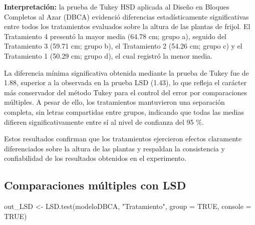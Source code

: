 \documentclass[
  spanish,
  letterpaper,
  DIV=11,
  numbers=noendperiod]{scrreprt}
\newenvironment{Shaded}{\begin{snugshade}}{\end{snugshade}}
\newcommand{\AttributeTok}[1]{\textcolor[rgb]{0.40,0.45,0.13}{#1}}
\newcommand{\ConstantTok}[1]{\textcolor[rgb]{0.56,0.35,0.01}{#1}}
\newcommand{\FunctionTok}[1]{\textcolor[rgb]{0.28,0.35,0.67}{#1}}
\newcommand{\NormalTok}[1]{\textcolor[rgb]{0.00,0.23,0.31}{#1}}
\newcommand{\OtherTok}[1]{\textcolor[rgb]{0.00,0.23,0.31}{#1}}
\newcommand{\StringTok}[1]{\textcolor[rgb]{0.13,0.47,0.30}{#1}}
\begin{document}
\textbf{Interpretación:} la prueba de Tukey HSD aplicada al Diseño en
Bloques Completos al Azar (DBCA) evidenció diferencias estadísticamente
significativas entre todos los tratamientos evaluados sobre la altura de
las plantas de frijol. El Tratamiento 4 presentó la mayor media (64.78
cm; grupo a), seguido del Tratamiento 3 (59.71 cm; grupo b), el
Tratamiento 2 (54.26 cm; grupo c) y el Tratamiento 1 (50.29 cm; grupo
d), el cual registró la menor media.

La diferencia mínima significativa obtenida mediante la prueba de Tukey
fue de 1.88, superior a la observada en la prueba LSD (1.43), lo que
refleja el carácter más conservador del método Tukey para el control del
error por comparaciones múltiples. A pesar de ello, los tratamientos
mantuvieron una separación completa, sin letras compartidas entre
grupos, indicando que todas las medias difieren significativamente entre
sí al nivel de confianza del 95 \%.

Estos resultados confirman que los tratamientos ejercieron efectos
claramente diferenciados sobre la altura de las plantas y respaldan la
consistencia y confiabilidad de los resultados obtenidos en el
experimento.

\subsection{Comparaciones múltiples con
LSD}\label{comparaciones-muxfaltiples-con-lsd}

\begin{Shaded}
\begin{Highlighting}[]
\NormalTok{out\_LSD }\OtherTok{\textless{}{-}} \FunctionTok{LSD.test}\NormalTok{(modeloDBCA, }\StringTok{"Tratamiento"}\NormalTok{, }\AttributeTok{group =} \ConstantTok{TRUE}\NormalTok{, }\AttributeTok{console =} \ConstantTok{TRUE}\NormalTok{)}
\end{Highlighting}
\end{Shaded}
\end{document}
